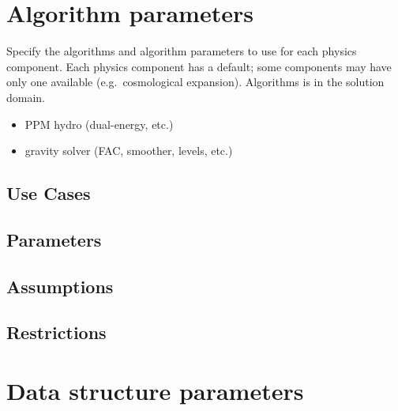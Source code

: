 \documentclass{book}
\begin{document}
\section{Algorithm parameters} \label{s:algorithm}

 Specify the algorithms and algorithm parameters
 to use for each physics component.  Each physics component has a
 default; some components may have only one available
 (e.g.~cosmological expansion).  Algorithms is in the solution domain.

\begin{itemize}
\item PPM hydro (dual-energy, etc.)
\item gravity solver (FAC, smoother, levels, etc.)
\end{itemize}

\subsection{Use Cases}
\subsection{Parameters}
\subsection{Assumptions}
\subsection{Restrictions}

\section{Data structure parameters} \label{s:data}
\end{document}
